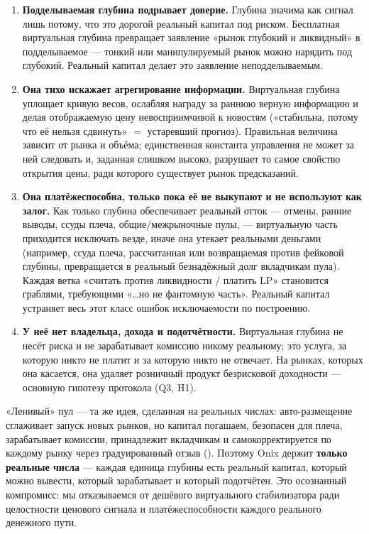 \documentclass{ledger}
\theoremstyle{plain}
\theoremstyle{remark}
\begin{document}
\begin{enumerate}
  \item \textbf{Подделываемая глубина подрывает доверие.} Глубина значима как
  сигнал лишь потому, что это дорогой реальный капитал под риском. Бесплатная
  виртуальная глубина превращает заявление «рынок глубокий и ликвидный» в
  подделываемое --- тонкий или манипулируемый рынок можно нарядить под глубокий.
  Реальный капитал делает это заявление неподделываемым.
  \item \textbf{Она тихо искажает агрегирование информации.} Виртуальная глубина
  уплощает кривую весов, ослабляя награду за раннюю верную информацию и делая
  отображаемую цену невосприимчивой к новостям («стабильна, потому что её нельзя
  сдвинуть» $=$ устаревший прогноз). Правильная величина зависит от рынка и объёма;
  единственная константа управления не может за ней следовать и, заданная слишком
  высоко, разрушает то самое свойство открытия цены, ради которого существует рынок
  предсказаний.
  \item \textbf{Она платёжеспособна, только пока её не выкупают и не используют как
  залог.} Как только глубина обеспечивает реальный отток --- отмены, ранние выводы,
  ссуды плеча, общие/межрыночные пулы, --- виртуальную часть приходится исключать
  везде, иначе она утекает реальными деньгами (например, ссуда плеча, рассчитанная
  или возвращаемая против фейковой глубины, превращается в реальный безнадёжный долг
  вкладчикам пула). Каждая ветка «считать против ликвидности / платить LP»
  становится граблями, требующими «\ldots но не фантомную часть». Реальный капитал
  устраняет весь этот класс ошибок исключаемости по построению.
  \item \textbf{У неё нет владельца, дохода и подотчётности.} Виртуальная глубина
  не несёт риска и не зарабатывает комиссию никому реальному; это услуга, за которую
  никто не платит и за которую никто не отвечает. На рынках, которых она касается,
  она удаляет розничный продукт безрисковой доходности --- основную гипотезу
  протокола (Q3, H1).
\end{enumerate}

«Ленивый» пул --- та же идея, сделанная на реальных числах: авто-размещение
сглаживает запуск новых рынков, но капитал погашаем, безопасен для плеча,
зарабатывает комиссии, принадлежит вкладчикам и самокорректируется по каждому рынку
через градуированный отзыв (). Поэтому Onix держит \textbf{только
реальные числа} --- каждая единица глубины есть реальный капитал, который можно
вывести, который зарабатывает и который подотчётен. Это осознанный компромисс: мы
отказываемся от дешёвого виртуального стабилизатора ради целостности ценового
сигнала и платёжеспособности каждого реального денежного пути.
\end{document}

